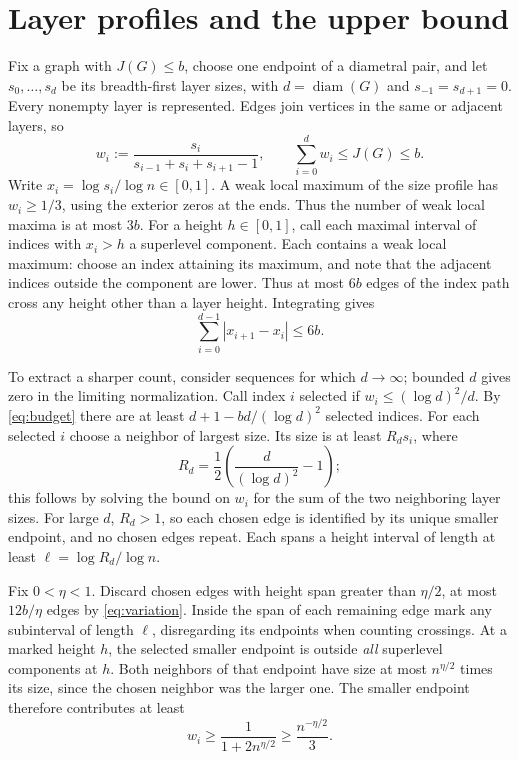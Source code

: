 \documentclass[10pt]{article}
\DeclareMathOperator{\diam}{diam}
\begin{document}
\section{Layer profiles and the upper bound}
Fix a graph with $J(G)\le b$, choose one endpoint of a diametral pair, and let $s_0,\ldots,s_d$ be its breadth-first layer sizes, with $d=\diam(G)$ and $s_{-1}=s_{d+1}=0$. Every nonempty layer is represented. Edges join vertices in the same or adjacent layers, so
\begin{equation}\label{eq:budget}
 w_i:=\frac{s_i}{s_{i-1}+s_i+s_{i+1}-1},
 \qquad \sum_{i=0}^{d} w_i\le J(G)\le b .
\end{equation}
Write $x_i=\log s_i/\log n\in[0,1]$. A weak local maximum of the size profile has $w_i\ge1/3$, using the exterior zeros at the ends. Thus the number of weak local maxima is at most $3b$. For a height $h\in[0,1]$, call each maximal interval of indices with $x_i>h$ a superlevel component. Each contains a weak local maximum: choose an index attaining its maximum, and note that the adjacent indices outside the component are lower. Thus at most $6b$ edges of the index path cross any height other than a layer height. Integrating gives
\begin{equation}\label{eq:variation}
 \sum_{i=0}^{d-1}|x_{i+1}-x_i|\le6b .
\end{equation}

To extract a sharper count, consider sequences for which $d\to\infty$; bounded $d$ gives zero in the limiting normalization. Call index $i$ selected if $w_i\le (\log d)^2/d$. By \eqref{eq:budget} there are at least $d+1-bd/(\log d)^2$ selected indices. For each selected $i$ choose a neighbor of largest size. Its size is at least $R_d s_i$, where
\[
 R_d=\frac12\left(\frac{d}{(\log d)^2}-1\right);
\]
this follows by solving the bound on $w_i$ for the sum of the two neighboring layer sizes. For large $d$, $R_d>1$, so each chosen edge is identified by its unique smaller endpoint, and no chosen edges repeat. Each spans a height interval of length at least $\ell=\log R_d/\log n$.

Fix $0<\eta<1$. Discard chosen edges with height span greater than $\eta/2$, at most $12b/\eta$ edges by \eqref{eq:variation}. Inside the span of each remaining edge mark any subinterval of length $\ell$, disregarding its endpoints when counting crossings. At a marked height $h$, the selected smaller endpoint is outside \emph{all} superlevel components at $h$. Both neighbors of that endpoint have size at most $n^{\eta/2}$ times its size, since the chosen neighbor was the larger one. The smaller endpoint therefore contributes at least
\begin{equation}\label{eq:extra}
 w_i\ge\frac{1}{1+2n^{\eta/2}}\ge\frac{n^{-\eta/2}}{3}.
\end{equation}
\end{document}
